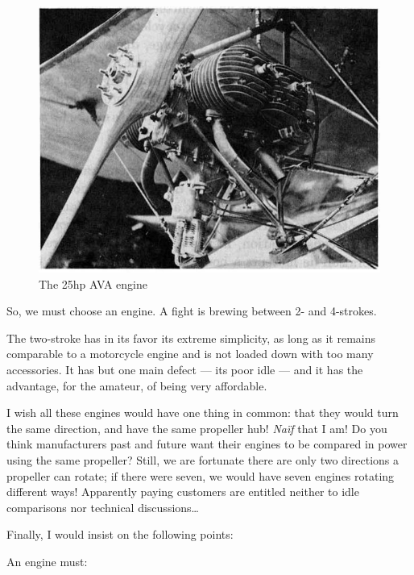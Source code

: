 \documentclass{book}
\begin{document}
\begin{figure}
  \includegraphics[width=\linewidth]{fig-53.jpg}
  \caption{The 25hp AVA engine}
  \label{fig:fiftythree}
\end{figure}

So, we must choose an engine.  A fight is brewing between 2- and
4-strokes.

The two-stroke has in its favor its extreme simplicity, as long as it
remains comparable to a motorcycle engine and is not loaded down with
too many accessories.  It has but one main defect --- its poor idle
--- and it has the advantage, for the amateur, of being very
affordable.

I wish all these engines would have one thing in common: that they
would turn the same direction, and have the same propeller hub!
\textit{Na\"if} that I am!  Do you think manufacturers past and future
want their engines to be compared in power using the same propeller?
Still, we are fortunate there are only two directions a propeller can
rotate; if there were seven, we would have seven engines rotating
different ways!  Apparently paying customers are entitled neither to
idle comparisons nor technical discussions\ldots

Finally, I would insist on the following points:

An engine must:

\end{document}
